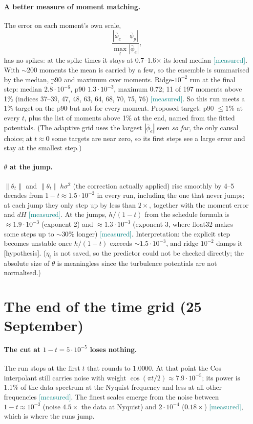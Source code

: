 \documentclass[11pt,a4paper]{article}
\newcommand{\meas}{\textcolor{teal}{\textsf{[measured]}}}
\newcommand{\hyp}{\textcolor{orange!80!black}{\textsf{[hypothesis]}}}
\begin{document}
\paragraph{A better measure of moment matching.} The error on each moment's own scale,
\[ \frac{|\bar\phi_e-\bar\phi_p|}{\max_t|\bar\phi_e|}, \]
has no spikes: at the spike times it stays at 0.7--1.6$\times$ its local median \meas. With $\sim200$
moments the mean is carried by a few, so the ensemble is summarised by the median, p90 and maximum over
moments. Ridge-$10^{-2}$ run at the final step: median $2.8\cdot10^{-6}$, p90 $1.3\cdot10^{-3}$, maximum
0.72; 11 of 197 moments above 1\% (indices 37--39, 47, 48, 63, 64, 68, 70, 75, 76) \meas. So this run meets
a 1\% target on the p90 but not for every moment. Proposed target: p90 $\le1\%$ at every $t$, plus the list of
moments above 1\% at the end, named from the fitted potentials. (The adaptive grid uses the largest
$|\bar\phi_e|$ seen \emph{so far}, the only causal choice; at $t\approx0$ some targets are near zero, so its
first steps see a large error and stay at the smallest step.)

\paragraph{$\theta$ at the jump.} $\|\theta_t\|$ and $\|\theta_t\|\,h\sigma^2$ (the correction
actually applied) rise smoothly by 4--5 decades from $1-t\approx1.5\cdot10^{-2}$ in every run,
including the one that never jumps; at each jump they only step up by less than $2\times$, together
with the moment error and $dH$ \meas. At the jumps, $h/(1-t)$ from the schedule formula is
$\approx1.9\cdot10^{-3}$ (exponent 2) and $\approx1.3\cdot10^{-3}$ (exponent 3, where float32 makes some
steps up to $\sim30\%$ longer) \meas. Interpretation: the explicit step becomes unstable once
$h/(1-t)$ exceeds $\sim1.5\cdot10^{-3}$, and ridge $10^{-2}$ damps it \hyp. ($\eta_t$ is not saved,
so the predictor could not be checked directly; the absolute size of $\theta$ is meaningless since the
turbulence potentials are not normalised.)

\section{The end of the time grid (25 September)}\label{sec:grid}
\paragraph{The cut at $1-t=5\cdot10^{-5}$ loses nothing.} The run stops at the first $t$ that rounds
to $1.0000$. At that point the Cos interpolant still carries noise with weight
$\cos(\pi t/2)\approx7.9\cdot10^{-5}$; its power is 1.1\% of the data spectrum at the Nyquist
frequency and less at all other frequencies \meas. The finest scales emerge from the noise between
$1-t\approx10^{-3}$ (noise $4.5\times$ the data at Nyquist) and $2\cdot10^{-4}$ ($0.18\times$) \meas,
which is where the runs jump.
\end{document}
